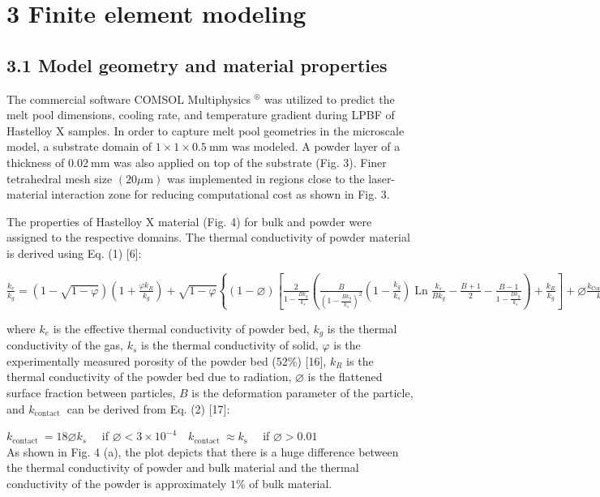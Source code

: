 \documentclass[10pt]{article}
\begin{document}
\section*{3 Finite element modeling}
\subsection*{3.1 Model geometry and material properties}
The commercial software COMSOL Multiphysics ${ }^{\circledR}$ was utilized to predict the melt pool dimensions, cooling rate, and temperature gradient during LPBF of Hastelloy X samples. In order to capture melt pool geometries in the microscale model, a substrate domain of $1 \times 1 \times 0.5 \mathrm{~mm}$ was modeled. A powder layer of a thickness of $0.02 \mathrm{~mm}$ was also applied on top of the substrate (Fig. 3). Finer tetrahedral mesh size $(20 \mu \mathrm{m})$ was implemented in regions close to the laser-material interaction zone for reducing computational cost as shown in Fig. 3.

The properties of Hastelloy X material (Fig. 4) for bulk and powder were assigned to the respective domains. The thermal conductivity of powder material is derived using Eq. (1) [6]:

$\frac{k_{e}}{k_{g}}=(1-\sqrt{1-\varphi})\left(1+\frac{\varphi k_{R}}{k_{g}}\right)+\sqrt{1-\varphi}\left\{(1-\varnothing)\left[\frac{2}{1-\frac{B k_{g}}{k_{s}}}\left(\frac{B}{\left(1-\frac{B k_{g}}{k_{s}}\right)^{2}}\left(1-\frac{k_{g}}{k_{s}}\right) \operatorname{Ln} \frac{k_{s}}{B k_{g}}-\frac{B+1}{2}-\frac{B-1}{1-\frac{B k_{g}}{k_{s}}}\right)+\frac{k_{R}}{k_{g}}\right]+\varnothing \frac{k_{\text {Contact }}}{k_{g}}\right\}$

where $k_{e}$ is the effective thermal conductivity of powder bed, $k_{g}$ is the thermal conductivity of the gas, $k_{s}$ is the thermal conductivity of solid, $\varphi$ is the experimentally measured porosity of the powder bed (52\%) [16], $k_{R}$ is the thermal conductivity of the powder bed due to radiation, $\varnothing$ is the flattened surface fraction between particles, $B$ is the deformation parameter of the particle, and $k_{\text {contact }}$ can be derived from Eq. (2) [17]:

$k_{\text {contact }}=18 \varnothing k_{s} \quad$ if $\varnothing<3 \times 10^{-4} \quad k_{\text {contact }} \approx k_{\mathrm{s}} \quad$ if $\varnothing>0.01$\\
As shown in Fig. 4 (a), the plot depicts that there is a huge difference between the thermal conductivity of powder and bulk material and the thermal conductivity of the powder is approximately $1 \%$ of bulk material.
\end{document}
